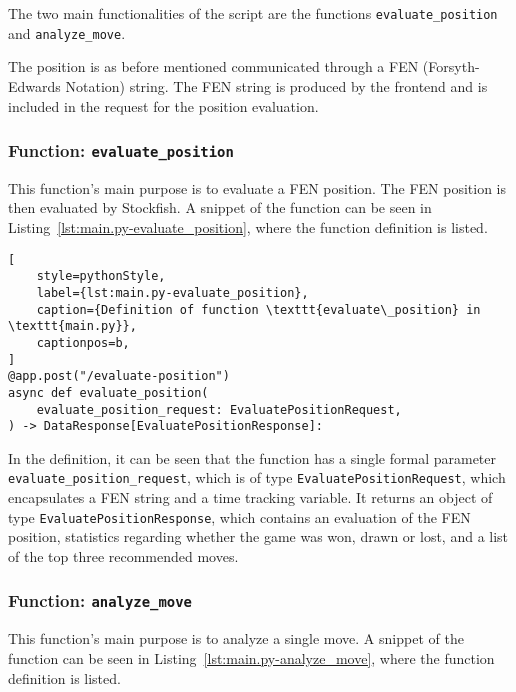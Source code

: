 The two main functionalities of the script are the functions \texttt{evaluate\_position} and \texttt{analyze\_move}.

The position is as before mentioned communicated through a FEN (Forsyth-Edwards Notation) string.
The FEN string is produced by the frontend and is included in the request for the position evaluation.


\subsubsection{Function: \texttt{evaluate\_position}}\label{subsubsec:function:evaluate_position}

This function's main purpose is to evaluate a FEN position.
The FEN position is then evaluated by Stockfish.
A snippet of the function can be seen in Listing~\ref{lst:main.py-evaluate_position}, where the function definition is
listed.

\begin{lstlisting}[
    style=pythonStyle,
    label={lst:main.py-evaluate_position},
    caption={Definition of function \texttt{evaluate\_position} in \texttt{main.py}},
    captionpos=b,
]
@app.post("/evaluate-position")
async def evaluate_position(
    evaluate_position_request: EvaluatePositionRequest,
) -> DataResponse[EvaluatePositionResponse]:
\end{lstlisting}

In the definition, it can be seen that the function has a single formal parameter \texttt{evaluate\_position\_request},
which is of type \texttt{EvaluatePositionRequest}, which encapsulates a FEN string and a time tracking variable.
It returns an object of type \texttt{EvaluatePositionResponse}, which contains an evaluation of the FEN position,
statistics regarding whether the game was won, drawn or lost, and a list of the top three recommended moves.


\subsubsection{Function: \texttt{analyze\_move}}\label{subsubsec:function:analyze_move}

This function's main purpose is to analyze a single move.
A snippet of the function can be seen in Listing~\ref{lst:main.py-analyze_move}, where the function definition is
listed.

